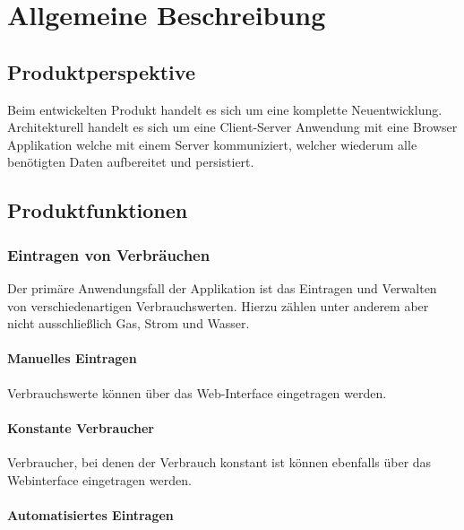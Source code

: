 \section{Allgemeine Beschreibung}


\subsection{Produktperspektive}


Beim entwickelten Produkt handelt es sich um eine komplette Neuentwicklung. Architekturell handelt es sich um eine Client-Server Anwendung mit eine Browser Applikation welche mit einem Server kommuniziert, welcher wiederum alle benötigten Daten aufbereitet und persistiert. %

\subsection{Produktfunktionen}

\subsubsection{Eintragen von Verbräuchen}

Der primäre Anwendungsfall der Applikation ist das Eintragen und Verwalten von verschiedenartigen Verbrauchswerten. Hierzu zählen unter anderem aber nicht ausschließlich Gas, Strom und Wasser.

\paragraph{Manuelles Eintragen}

Verbrauchswerte können über das Web-Interface eingetragen werden.

\paragraph{Konstante Verbraucher} %
Verbraucher, bei denen der Verbrauch konstant ist können ebenfalls über das Webinterface eingetragen werden.

\paragraph{Automatisiertes Eintragen} %
\label{autom_eintragen}


